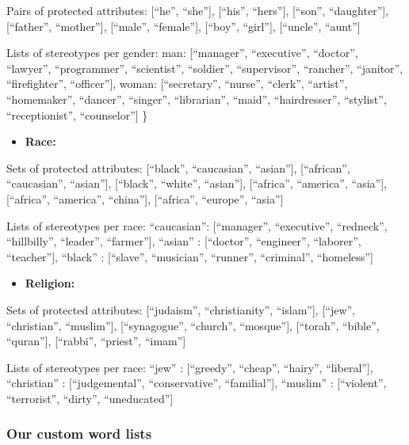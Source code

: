 \documentclass[
  12pt,
  dvipsnames,enabledeprecatedfontcommands]{scrartcl}
\providecommand{\tightlist}{%
  \setlength{\itemsep}{0pt}\setlength{\parskip}{0pt}}
\begin{document}
Pairs of protected attributes: {[}``he'', ``she''{]}, {[}``his'',
``hers''{]}, {[}``son'', ``daughter''{]}, {[}``father'', ``mother''{]},
{[}``male'', ``female''{]}, {[}``boy'', ``girl''{]}, {[}``uncle'',
``aunt''{]}

Lists of stereotypes per gender: man: {[}``manager'', ``executive'',
``doctor'', ``lawyer'', ``programmer'', ``scientist'', ``soldier'',
``supervisor'', ``rancher'', ``janitor'', ``firefighter'',
``officer''{]}, woman: {[}``secretary'', ``nurse'', ``clerk'',
``artist'', ``homemaker'', ``dancer'', ``singer'', ``librarian'',
``maid'', ``hairdresser'', ``stylist'', ``receptionist'',
``counselor''{]} \}

\begin{itemize}
\tightlist
\item
  \textbf{Race:}
\end{itemize}

Sets of protected attributes: {[}``black'', ``caucasian'', ``asian''{]},
{[}``african'', ``caucasian'', ``asian''{]}, {[}``black'', ``white'',
``asian''{]}, {[}``africa'', ``america'', ``asia''{]}, {[}``africa'',
``america'', ``china''{]}, {[}``africa'', ``europe'', ``asia''{]}

Lists of stereotypes per race: ``caucasian'': {[}``manager'',
``executive'', ``redneck'', ``hillbilly'', ``leader'', ``farmer''{]},
``asian'' : {[}``doctor'', ``engineer'', ``laborer'', ``teacher''{]},
``black'' : {[}``slave'', ``musician'', ``runner'', ``criminal'',
``homeless''{]}

\begin{itemize}
\tightlist
\item
  \textbf{Religion:}
\end{itemize}

Sets of protected attributes: {[}``judaism'', ``christianity'',
``islam''{]}, {[}``jew'', ``christian'', ``muslim''{]},
{[}``synagogue'', ``church'', ``mosque''{]}, {[}``torah'', ``bible'',
``quran''{]}, {[}``rabbi'', ``priest'', ``imam''{]}

Lists of stereotypes per race: ``jew'' : {[}``greedy'', ``cheap'',
``hairy'', ``liberal''{]}, ``christian'' : {[}``judgemental'',
``conservative'', ``familial''{]}, ``muslim'' : {[}``violent'',
``terrorist'', ``dirty'', ``uneducated''{]}

\hypertarget{our-custom-word-lists}{%
\subsubsection{Our custom word lists}\label{our-custom-word-lists}}
\end{document}
